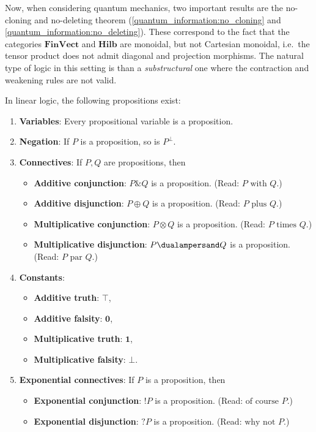     Now, when considering quantum mechanics, two important results are the no-cloning and no-deleting theorem (\cref{quantum_information:no_cloning} and \cref{quantum_information:no_deleting}). These correspond to the fact that the categories $\mathbf{FinVect}$ and $\mathbf{Hilb}$ are monoidal, but not Cartesian monoidal, i.e.~the tensor product does not admit diagonal and projection morphisms. The natural type of logic in this setting is than a \textit{substructural} one where the contraction and weakening rules are not valid.

    In linear logic, the following propositions exist:
    \begin{enumerate}
        \item\textbf{Variables}: Every propositional variable is a proposition.
        \item\textbf{Negation}: If $P$ is a proposition, so is $P^\perp$.
        \item\textbf{Connectives}: If $P,Q$ are propositions, then
            \begin{itemize}
                \item\textbf{Additive conjunction}: $P\& Q$ is a proposition. (Read: $P\text{ with }Q$.)
                \item\textbf{Additive disjunction}: $P\oplus Q$ is a proposition. (Read: $P\text{ plus }Q$.)
                \item\textbf{Multiplicative conjunction}: $P\otimes Q$ is a proposition. (Read: $P\text{ times }Q$.)
                \item\textbf{Multiplicative disjunction}: $P\dualampersand Q$ is a proposition. (Read: $P\text{ par }Q$.)
            \end{itemize}
        \item\textbf{Constants}:
            \begin{itemize}
                \item\textbf{Additive truth}: $\top$,
                \item\textbf{Additive falsity}: $\mathbf{0}$,
                \item\textbf{Multiplicative truth}: $\mathbf{1}$,
                \item\textbf{Multiplicative falsity}: $\bot$.
            \end{itemize}
        \item\textbf{Exponential connectives}: If $P$ is a proposition, then
            \begin{itemize}
                \item\textbf{Exponential conjunction}: $!P$ is a proposition. (Read: $\text{of course }P$.)
                \item\textbf{Exponential disjunction}: $?P$ is a proposition. (Read: $\text{why not }P$.)
            \end{itemize}
    \end{enumerate}
